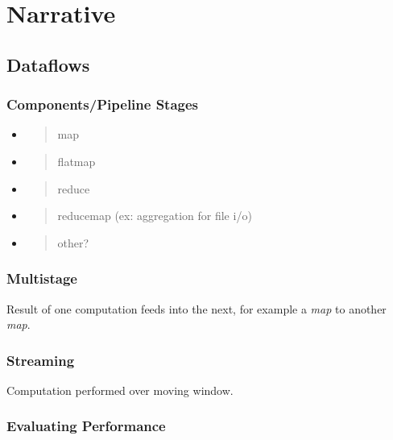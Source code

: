 \section{Narrative}

\subsection{Dataflows}\label{dataflows}

\subsubsection{Components/Pipeline Stages}\label{componentspipeline-stages}

\begin{itemize}
\item
  \begin{quote}
  map
  \end{quote}
\item
  \begin{quote}
  flatmap
  \end{quote}
\item
  \begin{quote}
  reduce
  \end{quote}
\item
  \begin{quote}
  reducemap (ex: aggregation for file i/o)
  \end{quote}
\item
  \begin{quote}
  other?
  \end{quote}
\end{itemize}

\subsubsection{Multistage}\label{multistage}

Result of one computation feeds into the next, for example a \emph{map}
to another \emph{map}.

\subsubsection{Streaming}\label{streaming}

Computation performed over moving window.

\subsubsection{Evaluating Performance}\label{evaluating-performance}


